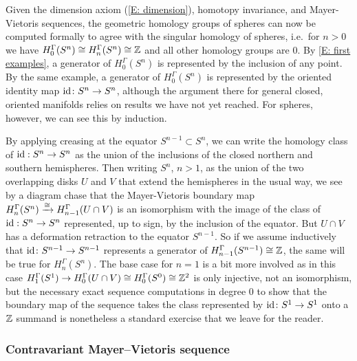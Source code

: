 \begin{example}\label{E: sphere homology}
Given the dimension axiom (\cref{E: dimension}), homotopy invariance, and Mayer-Vietoris sequences, the geometric homology groups of spheres can now be computed formally to agree with the singular homology of spheres, i.e.\ for $n>0$ we have $H_0^{\Gamma}(S^n)\cong H_n^\Gamma(S^n)\cong \mathbb{Z}$ and all other homology groups are $0$.
By \cref{E: first examples}, a generator of $H_0^{\Gamma}(S^n)$ is represented by the inclusion of any point.
By the same example, a generator of $H_0^{\Gamma}(S^n)$ is represented by the oriented identity map $\mathrm{id} \colon S^n \to S^n$, although the argument there for general closed, oriented manifolds relies on results we have not yet reached.
For spheres, however, we can see this by induction.

By applying creasing at the equator $S^{n-1}\subset S^n$, we can write the homology class of $\mathrm{id}: S^n \to S^n$ as the union of the inclusions of the closed northern and southern hemispheres. Then writing $S^n$, $n>1$, as the union of the two overlapping disks $U$ and $V$ that extend the hemispheres in the usual way, we see by a diagram chase that the Mayer-Vietoris boundary map $H_n^\Gamma(S^n)\xrightarrow{\cong} H_{n-1}^\Gamma(U \cap V)$ is an isomorphism with the image of the class of $\mathrm{id}: S^n \to S^n$ represented, up to sign, by the inclusion of the equator.
But $U \cap V$ has a deformation retraction to the equator $S^{n-1}$.
So if we assume inductively that $\mathrm{id} \colon S^{n-1} \to S^{n-1}$ represents a generator of $H_{n-1}^\Gamma(S^{n-1})\cong \mathbb{Z}$, the same will be true for $H_n^\Gamma(S^n)$.
The base case for $n=1$ is a bit more involved as in this case $H_1^\Gamma(S^1) \to H_{0}^\Gamma(U \cap V) \cong H_0^\Gamma(S^0) \cong \mathbb{Z}^2$ is only injective, not an isomorphism, but the necessary exact sequence computations in degree $0$ to show that the boundary map of the sequence takes the class represented by $\mathrm{id} \colon S^1 \to S^1$ onto a $\mathbb{Z}$ summand is nonetheless a standard exercise that we leave for the reader.
\end{example}

\subsubsection{Contravariant Mayer--Vietoris sequence}

\begin{comment}
	\red{[GBF: Note - the work in this section uses the following formulas which need to be confirmed at some point and stated clearly: $\bd W^- = W^0+(\bd W)^+$, $\bd W^+ = - W^0+(\bd W)^-$, $\bd W^0 = -(\bd W)^0$.
		The should all follow from the Liebniz rule for pullbacks using $W^- = \varphi^{-1}([0,p]) \times_M W$, $W^+ = \varphi^{-1}([p,1]) \times_M W$, and $W^0 = \varphi^{-1}(p) \times_M W$.
		PLEASE DO NOT ERASE THIS NOTE UNTIL THESE FORMULAS HAVE BEEN ESTABLISHED AND WRITTEN INTO THE PAPER SOMEWHERE]}
\end{comment}


